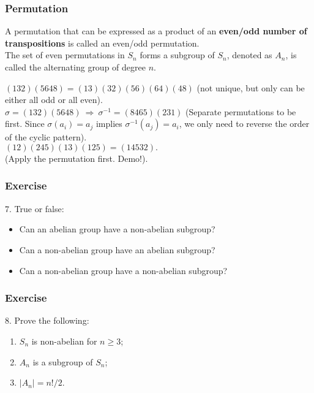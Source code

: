 \documentclass{beamer}
\begin{document}
\begin{frame}
    \frametitle{Permutation}
    \hh A permutation that can be expressed as a product of an \textbf{even/odd number 
    of transpositions} is called an even/odd permutation. \\
    \hh The set of even permutations in $S_n$ forms 
    a subgroup of $S_n$, denoted as $A_n$, 
    is called the alternating group of degree $n$. \\\vv

     $(132)(5648)=(13)(32)(56)(64)(48)$ (not unique, but only can be either all odd or all even).
	\\\vs{0.3em}
	 $\sigma=(132)(5648) \ \Rightarrow \ \sigma^{-1}=(8465)(231)$ 
    (Separate permutations to be \textbf{} first. Since $\sigma(a_i) = a_j$ implies $\sigma^{-1}(a_j) = a_i$, we only need to reverse the order of the cyclic pattern).
	\\\vs{0.3em}
	 $(12)(245)(13)(125) = (14532).$ \\
    (Apply the \textbf{} permutation first. Demo!).
\end{frame}
\begin{frame}
    \frametitle{Exercise}
    7. True or false:
    \begin{itemize}
        \item Can an abelian group have a non-abelian subgroup?
        \item Can a non-abelian group have an abelian subgroup?
        \item Can a non-abelian group have a non-abelian subgroup?
    \end{itemize}
    \vs{3em}
\end{frame}
\begin{frame}
    \frametitle{Exercise}
        8. Prove the following:
        \begin{enumerate}
            \item $S_n$ is non-abelian for $n\geq 3$;~\\
            \item $A_n$ is a subgroup of $S_n$;~\\
            \item $|A_n|=n!/2.$~\\
        \end{enumerate}
\end{frame}
\end{document}
